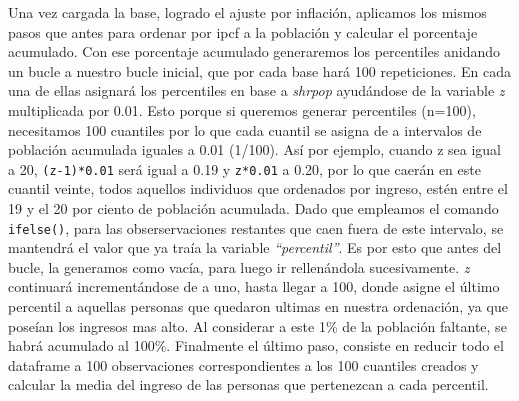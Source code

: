 \documentclass[
]{book}
\begin{document}
Una vez cargada la base, logrado el ajuste por inflación, aplicamos los mismos pasos que antes para ordenar por ipcf a la población y calcular el porcentaje acumulado. Con ese porcentaje acumulado generaremos los percentiles anidando un bucle a nuestro bucle inicial, que por cada base hará 100 repeticiones. En cada una de ellas asignará los percentiles en base a \emph{shrpop} ayudándose de la variable \emph{z} multiplicada por 0.01. Esto porque si queremos generar percentiles (n=100), necesitamos 100 cuantiles por lo que cada cuantil se asigna de a intervalos de población acumulada iguales a 0.01 (1/100). Así por ejemplo, cuando z sea igual a 20, \texttt{(z-1)*0.01} será igual a 0.19 y \texttt{z*0.01} a 0.20, por lo que caerán en este cuantil veinte, todos aquellos individuos que ordenados por ingreso, estén entre el 19 y el 20 por ciento de población acumulada. Dado que empleamos el comando \texttt{ifelse()}, para las obserservaciones restantes que caen fuera de este intervalo, se mantendrá el valor que ya traía la variable \emph{``percentil''}. Es por esto que antes del bucle, la generamos como vacía, para luego ir rellenándola sucesivamente. \emph{z} continuará incrementándose de a uno, hasta llegar a 100, donde asigne el último percentil a aquellas personas que quedaron ultimas en nuestra ordenación, ya que poseían los ingresos mas alto. Al considerar a este 1\% de la población faltante, se habrá acumulado al 100\%. Finalmente el último paso, consiste en reducir todo el dataframe a 100 observaciones correspondientes a los 100 cuantiles creados y calcular la media del ingreso de las personas que pertenezcan a cada percentil.
\end{document}
